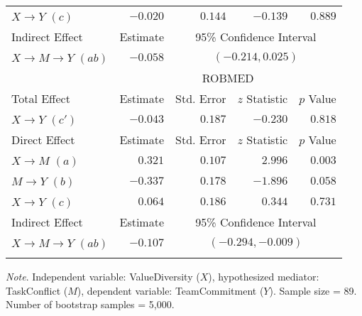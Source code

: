 \documentclass{article}\usepackage[]{graphicx}\usepackage[]{xcolor}
\begin{document}
\begin{table}[h!]
\begin{center}
\begin{tabular}{lrrrr}
$X \rightarrow Y$ $(c)$ & $-0.020$ & $ 0.144$ & $-0.139$ & $ 0.889$ \\ 
\noalign{\smallskip}\hline\noalign{\smallskip}
Indirect Effect & Estimate & \multicolumn{3}{c}{95\% Confidence Interval} \\ 
\noalign{\smallskip}\hline\noalign{\smallskip}
$X \rightarrow M \rightarrow Y$ $(ab)$ & $-0.058$ & \multicolumn{3}{c}{$(-0.214,  0.025)$} \\ 
\noalign{\smallskip}\hline\noalign{\smallskip}
 & \multicolumn{4}{c}{ROBMED} \\ 
\noalign{\smallskip}\cline{2- 5 }\noalign{\smallskip}
Total Effect & Estimate & Std. Error & $z$ Statistic & $p$ Value \\ 
\noalign{\smallskip}\hline\noalign{\smallskip}
$X \rightarrow Y$ $(c')$ & $-0.043$ & $ 0.187$ & $-0.230$ & $ 0.818$ \\ 
\noalign{\smallskip}\hline\noalign{\smallskip}
Direct Effect & Estimate & Std. Error & $z$ Statistic & $p$ Value \\ 
\noalign{\smallskip}\hline\noalign{\smallskip}
$X \rightarrow M$ $(a)$ & $ 0.321$ & $ 0.107$ & $ 2.996$ & $ 0.003$ \\ 
$M \rightarrow Y$ $(b)$ & $-0.337$ & $ 0.178$ & $-1.896$ & $ 0.058$ \\ 
$X \rightarrow Y$ $(c)$ & $ 0.064$ & $ 0.186$ & $ 0.344$ & $ 0.731$ \\ 
\noalign{\smallskip}\hline\noalign{\smallskip}
Indirect Effect & Estimate & \multicolumn{3}{c}{95\% Confidence Interval} \\ 
\noalign{\smallskip}\hline\noalign{\smallskip}
$X \rightarrow M \rightarrow Y$ $(ab)$ & $-0.107$ & \multicolumn{3}{c}{$(-0.294, -0.009)$} \\ 
\noalign{\smallskip}\hline
\end{tabular}
\end{center}
\emph{Note}. Independent variable: ValueDiversity ($X$), hypothesized mediator: TaskConflict ($M$), dependent variable: TeamCommitment ($Y$). Sample size = 89. Number of bootstrap samples = 5,000. 

\end{table}
\end{document}
